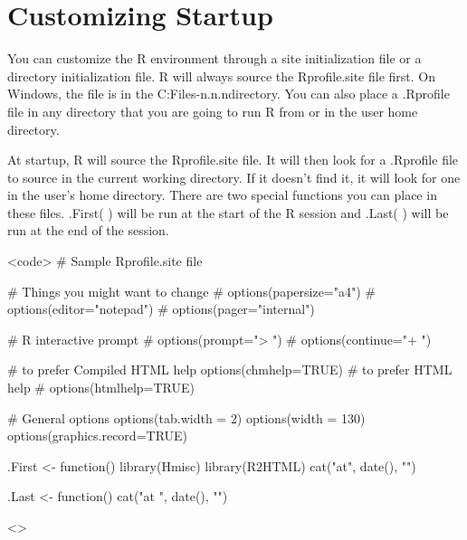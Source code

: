 \section{Customizing Startup}

You can customize the R environment through a site initialization file or a directory initialization file. 
R will always source the Rprofile.site file first. 
On Windows, the file is in the C:\Program Files\R\R-n.n.n\etc directory. You can also place a .Rprofile file in any directory that you are going to run R from or in the user home directory. 

At startup, R will source the Rprofile.site file. 
It will then look for a .Rprofile file to source in the current working directory. 
If it doesn't find it, it will look for one in the user's home directory. There are two special functions you can place in these files. .First( ) will be run at the start of the R session and .Last( ) will be run at the end of the session. 

<code>
# Sample Rprofile.site file 

# Things you might want to change
 # options(papersize="a4") 
# options(editor="notepad") 
# options(pager="internal")

 # R interactive prompt 
# options(prompt="> ")
 # options(continue="+ ") 

# to prefer Compiled HTML 
help options(chmhelp=TRUE) 
# to prefer HTML help 
# options(htmlhelp=TRUE) 

# General options 
options(tab.width = 2) 
options(width = 130)
 options(graphics.record=TRUE) 

.First <- function(){
  library(Hmisc)
  library(R2HTML)
  cat("\nWelcome at", date(), "\n") 
}

 .Last <- function(){ 
 cat("\nGoodbye at ", date(), "\n")
 }

<\code>



